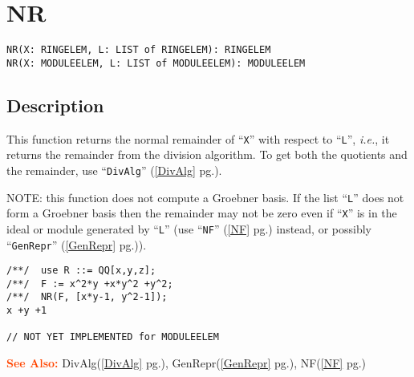 \documentclass[a4paper]{mybook}
\newenvironment{command}{}{} %
\newcommand\SeeAlso{\par\textcolor{OrangeRed}{\textbf{\large See Also: }}}
\begin{document}
\section{NR}
\label{NR}
\begin{command} %


\begin{Verbatim}[label=syntax, rulecolor=\color{MidnightBlue},
frame=single]
NR(X: RINGELEM, L: LIST of RINGELEM): RINGELEM
NR(X: MODULEELEM, L: LIST of MODULEELEM): MODULEELEM
\end{Verbatim}


\subsection*{Description}

This function returns the normal remainder of ``\verb&X&'' with respect to ``\verb&L&'',
\textit{i.e.}, it returns the remainder from the division algorithm.  To get
both the quotients and the remainder, use ``\verb&DivAlg&'' (\ref{DivAlg} pg.\pageref{DivAlg}).
\par 
NOTE: this function does not compute a Groebner basis.  If the
list ``\verb&L&'' does not form a Groebner basis then the remainder may
not be zero even if ``\verb&X&'' is in the ideal or module generated by ``\verb&L&''
(use ``\verb&NF&'' (\ref{NF} pg.\pageref{NF}) instead, or possibly ``\verb&GenRepr&'' (\ref{GenRepr} pg.\pageref{GenRepr})).
\begin{Verbatim}[label=example, rulecolor=\color{PineGreen}, frame=single]
/**/  use R ::= QQ[x,y,z];
/**/  F := x^2*y +x*y^2 +y^2;
/**/  NR(F, [x*y-1, y^2-1]);
x +y +1

// NOT YET IMPLEMENTED for MODULEELEM
\end{Verbatim}


\SeeAlso %
  DivAlg(\ref{DivAlg} pg.\pageref{DivAlg}), 
    GenRepr(\ref{GenRepr} pg.\pageref{GenRepr}), 
    NF(\ref{NF} pg.\pageref{NF})
\end{command} %
\end{document}
